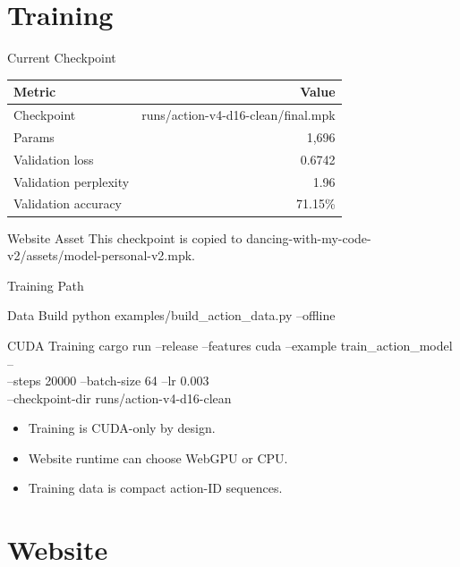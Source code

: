 \documentclass[10pt,aspectratio=169]{beamer}
\newcommand{\code}[1]{{\normalfont\footnotesize #1}}
\begin{document}
\section{Training}

\begin{frame}{Current Checkpoint}
  \small
  \centering
  \begin{tabular}{lr}
    \toprule
    \textbf{Metric} & \textbf{Value} \\
    \midrule
    Checkpoint & \code{runs/action-v4-d16-clean/final.mpk} \\
    Params & 1,696 \\
    Validation loss & 0.6742 \\
    Validation perplexity & 1.96 \\
    Validation accuracy & \alert{71.15\%} \\
    \bottomrule
  \end{tabular}

  \bigskip
  \begin{block}{Website Asset}
    This checkpoint is copied to \code{dancing-with-my-code-v2/assets/model-personal-v2.mpk}.
  \end{block}
\end{frame}

\begin{frame}{Training Path}
  \begin{block}{Data Build}
    \code{python examples/build\_action\_data.py --offline}
  \end{block}

  \begin{block}{CUDA Training}
    \small
    \code{cargo run --release --features cuda --example train\_action\_model --}\\
    \code{\quad --steps 20000 --batch-size 64 --lr 0.003}\\
    \code{\quad --checkpoint-dir runs/action-v4-d16-clean}
  \end{block}

  \begin{itemize}
    \item Training is CUDA-only by design.
    \item Website runtime can choose WebGPU or CPU.
    \item Training data is compact action-ID sequences.
  \end{itemize}
\end{frame}

\section{Website}
\end{document}

